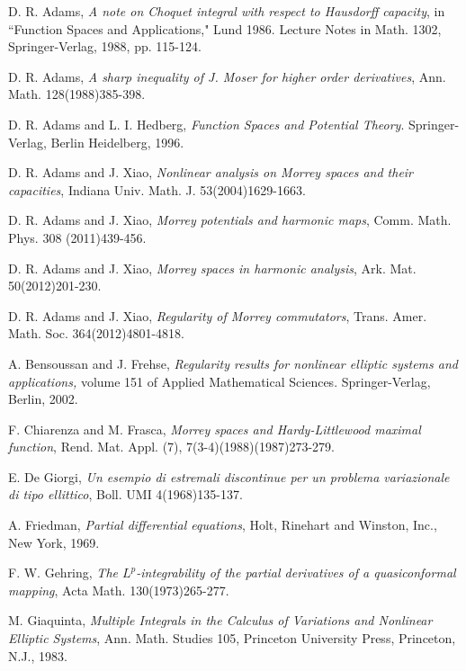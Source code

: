 \documentclass[12pt]{amsart}
\begin{document}
\begin{thebibliography}{99}

 D. R. Adams, {\it A note on Choquet integral with respect to
Hausdorff capacity}, {in ``Function Spaces and Applications,}" Lund
1986. {Lecture Notes in Math.} {1302}, Springer-Verlag, 1988,
pp. 115-124.

 D. R. Adams, {\it A sharp inequality of J. Moser for higher order derivatives},
{Ann. Math.} 128(1988)385-398.

 D. R. Adams and L. I. Hedberg, \emph{Function Spaces and Potential Theory}. {Springer-Verlag}, Berlin Heidelberg, 1996.

 D. R. Adams and J. Xiao, {\it Nonlinear analysis on Morrey spaces and their capacities}, {Indiana Univ. Math. J.} {53}(2004)1629-1663.

 D. R. Adams and J. Xiao, {\it Morrey potentials and harmonic maps}, {Comm. Math. Phys.} 308 (2011)439-456.

 D. R. Adams and J. Xiao, {\it Morrey spaces in harmonic analysis}, {Ark. Mat.} 50(2012)201-230.

 D. R. Adams and J. Xiao, {\it Regularity of Morrey commutators}, {Trans. Amer. Math. Soc.} 364(2012)4801-4818.

 A. Bensoussan and J. Frehse, \emph{Regularity results for
nonlinear elliptic systems and applications,} volume 151 of
{Applied Mathematical Sciences}. Springer-Verlag, Berlin, 2002.

 F. Chiarenza and M. Frasca, {\it Morrey spaces and Hardy-Littlewood
maximal function}, {Rend. Mat. Appl. (7)}, 7(3-4)(1988)(1987)273-279.

 E. De Giorgi, {\it Un esempio di estremali discontinue per un problema variazionale di tipo ellittico}, Boll. UMI 4(1968)135-137.

 A. Friedman, \emph{Partial differential equations}, Holt,
Rinehart and Winston, Inc., New York, 1969.

 F. W. Gehring, {\it The {$L^{p}$}-integrability of the partial
derivatives of a quasiconformal mapping}, {Acta Math.} 130(1973)265-277.

 M. Giaquinta, {\it Multiple Integrals in the Calculus of
Variations and Nonlinear Elliptic Systems}, {Ann. Math. Studies}
105, Princeton University Press, Princeton, N.J., 1983.


\end{thebibliography}
\end{document}
